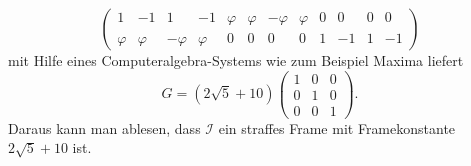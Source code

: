 \begin{loesung}
\begin{teilaufgaben}
\[\begin{pmatrix}
      1&     -1&       1&     -1&
\varphi&\varphi&-\varphi&\varphi&
      0&      0&       0&      0
\\
\varphi&\varphi&-\varphi&\varphi&
      0&      0&       0&      0&
      1&     -1&       1&     -1
\end{pmatrix}
\]
mit Hilfe eines Computeralgebra-Systems wie zum Beispiel Maxima liefert
\[
G
=
(2\sqrt{5}+10)
\begin{pmatrix}
1&0&0\\
0&1&0\\
0&0&1
\end{pmatrix}.
\]
Daraus kann man ablesen, dass $\mathcal{I}$ ein straffes Frame mit 
Framekonstante $2\sqrt{5}+10$ ist.
\end{teilaufgaben}
\end{loesung}




